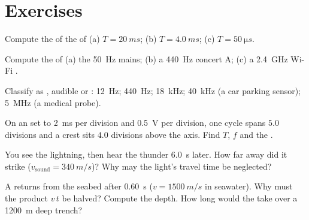 \section{Exercises}

\begin{exercise}[$\star$]\label{exo:g10:signals-and-waves:1}
Compute the  of the  of 
(a) $T = \qty{20}{ms}$; (b) $T = \qty{4.0}{ms}$;
(c) $T = \qty{50}{\micro s}$.
\end{exercise}

\begin{exercise}[$\star$]\label{exo:g10:signals-and-waves:2}
Compute the  of (a) the \qty{50}{Hz} mains; (b) a \qty{440}{Hz}
concert A; (c) a \qty{2.4}{GHz} Wi-Fi .
\end{exercise}

\begin{exercise}[$\star$]\label{exo:g10:signals-and-waves:3}
Classify as , audible  or : \qty{12}{Hz};
\qty{440}{Hz}; \qty{18}{kHz}; \qty{40}{kHz} (a car parking sensor);
\qty{5}{MHz} (a medical probe).
\end{exercise}

\begin{exercise}[$\star$]\label{exo:g10:signals-and-waves:4}
On an  set to \qty{2}{ms} per division and \qty{0.5}{V} per
division, one cycle spans $5.0$ divisions and a crest sits $4.0$
divisions above the axis. Find $T$, $f$ and the .
\end{exercise}

\begin{exercise}[$\star$]\label{exo:g10:signals-and-waves:5}
You see the lightning, then hear the thunder \qty{6.0}{s} later. How far
away did it strike ($v_{\text{sound}} = \qty{340}{m/s}$)? Why may the
light's travel time be neglected?
\end{exercise}

\begin{exercise}[$\star\star$]\label{exo:g10:signals-and-waves:6}
A   returns from the seabed after \qty{0.60}{s}
($v = \qty{1500}{m/s}$ in seawater). Why must the product $v\,t$ be
halved? Compute the depth. How long would the  take over a
\qty{1200}{m} deep trench?
\end{exercise}


